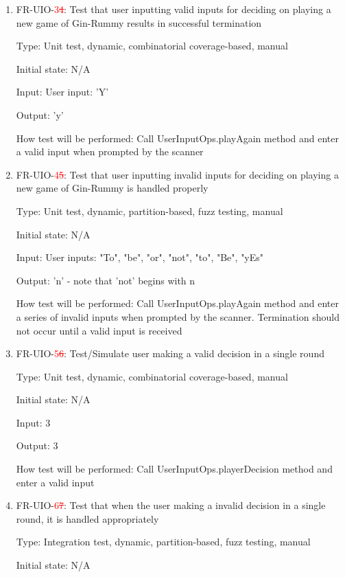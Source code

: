 \documentclass[12pt, titlepage]{article}
\begin{document}
\begin{enumerate}
    \item{FR-UIO-\textcolor{red}{3\sout{4}}: Test that user inputting valid inputs for deciding on playing a new game of Gin-Rummy results in successful termination}
    
    Type: Unit test, dynamic, combinatorial coverage-based, manual
    
    Initial state: N/A
    
    Input: User input: 'Y'
    
    Output: 'y'
    
    How test will be performed: Call UserInputOps.playAgain method and enter a valid input when prompted by the scanner
    
    \item{FR-UIO-\textcolor{red}{4\sout{5}}: Test that user inputting invalid inputs for deciding on playing a new game of Gin-Rummy is handled properly}
    
    Type: Unit test, dynamic, partition-based, fuzz testing, manual
    
    Initial state: N/A
    
    Input: User inputs: "To", "be", "or", "not", "to", "Be", "yEs"
    
    Output: 'n' - note that 'not' begins with n
    
    How test will be performed: Call UserInputOps.playAgain method and enter a series of invalid inputs when prompted by the scanner. Termination should not occur until a valid input is received
    
    \item{FR-UIO-\textcolor{red}{5\sout{6}}: Test/Simulate user making a valid decision in a single round}
    
    Type: Unit test, dynamic, combinatorial coverage-based, manual
    
    Initial state: N/A
    
    Input: 3
    
    Output: 3
    
    How test will be performed: Call UserInputOps.playerDecision method and enter a valid input
    
    \item{FR-UIO-\textcolor{red}{6\sout{7}}: Test that when the user making a invalid decision in a single round, it is handled appropriately}
    
    Type: Integration test, dynamic, partition-based, fuzz testing, manual
    
    Initial state: N/A
    

\end{enumerate}
\end{document}
